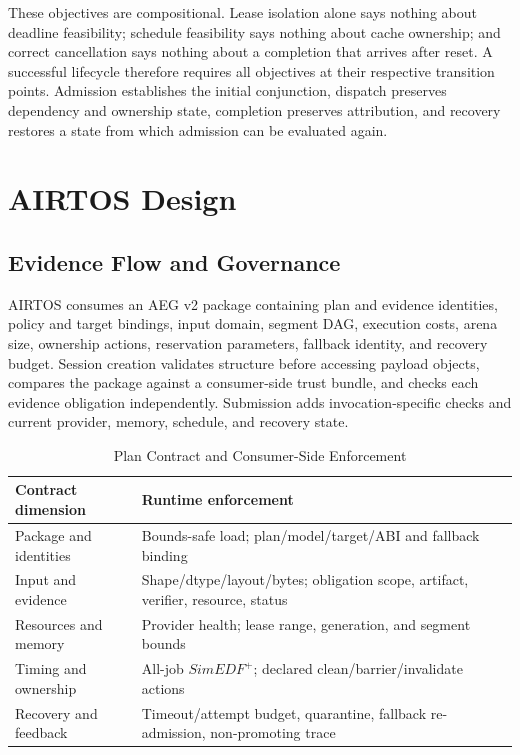 \documentclass[lettersize,journal]{IEEEtran}
\begin{document}
These objectives are compositional. Lease isolation alone says nothing about
deadline feasibility; schedule feasibility says nothing about cache ownership;
and correct cancellation says nothing about a completion that arrives after
reset. A successful lifecycle therefore requires all objectives at their
respective transition points. Admission establishes the initial conjunction,
dispatch preserves dependency and ownership state, completion preserves
attribution, and recovery restores a state from which admission can be
evaluated again.

\section{AIRTOS Design}
\subsection{Evidence Flow and Governance}
AIRTOS consumes an AEG v2 package containing plan and evidence identities,
policy and target bindings, input domain, segment DAG, execution costs, arena
size, ownership actions, reservation parameters, fallback identity, and
recovery budget. Session creation validates structure before accessing payload
objects, compares the package against a consumer-side trust bundle, and checks
each evidence obligation independently. Submission adds invocation-specific
checks and current provider, memory, schedule, and recovery state.

\begin{table}[t]
\caption{Plan Contract and Consumer-Side Enforcement}
\label{tab:contract}
\centering
\footnotesize
\begin{tabular}{@{}p{}p{}@{}}
\toprule
Contract dimension & Runtime enforcement \\
\midrule
Package and identities & Bounds-safe load; plan/model/target/ABI and fallback binding \\
Input and evidence & Shape/dtype/layout/bytes; obligation scope, artifact, verifier, resource, status \\
Resources and memory & Provider health; lease range, generation, and segment bounds \\
Timing and ownership & All-job $SimEDF^+$; declared clean/barrier/invalidate actions \\
Recovery and feedback & Timeout/attempt budget, quarantine, fallback re-admission, non-promoting trace \\
\bottomrule
\end{tabular}
\end{table}
\end{document}
